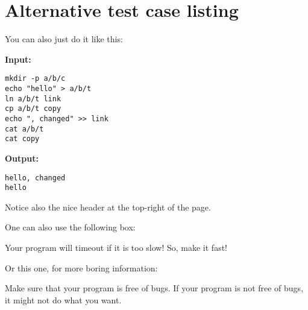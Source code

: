 \documentclass{progr-assgt}
\begin{document}

\section{Alternative test case listing}
You can also just do it like this:

\textbf{Input:}
\begin{lstlisting}[style=nostyle]
mkdir -p a/b/c
echo "hello" > a/b/t
ln a/b/t link
cp a/b/t copy
echo ", changed" >> link
cat a/b/t
cat copy
\end{lstlisting}

\textbf{Output:}
\begin{lstlisting}[style=nostyle]
hello, changed
hello
\end{lstlisting}

Notice also the nice header at the top-right of the page.

One can also use the following box:

\begin{alert}
    Your program will timeout if it is too slow! So, make it fast!
\end{alert}

Or this one, for more boring information:
\begin{note}
    Make sure that your program is free of bugs. If your program is not free of bugs, it might not do what you want.
\end{note}
\end{document}
